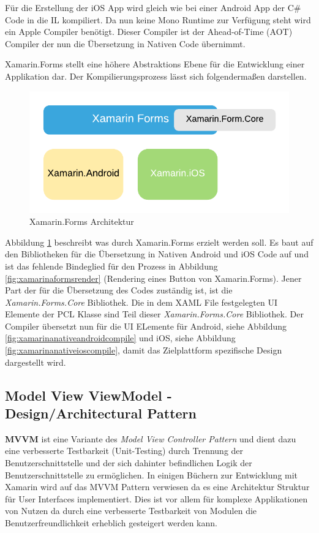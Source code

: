 	Für die Erstellung der iOS App wird gleich wie bei einer Android App der C\# Code in die IL kompiliert. Da nun keine Mono Runtime zur Verfügung steht wird ein Apple Compiler benötigt. Dieser Compiler ist der Ahead-of-Time (AOT) Compiler der nun die Übersetzung in Nativen Code übernimmt.

	Xamarin.Forms stellt eine höhere Abstraktions Ebene für die Entwicklung einer Applikation dar. Der Kompilierungsprozess lässt sich folgendermaßen darstellen.
	\begin{figure}[h!]
		\centering
		\includegraphics[width=1\textwidth]{images/Xamarin-Forms.png}
		\caption{Xamarin.Forms Architektur}
		\label{fig:xamarinformsarchitecture}
	\end{figure}

	Abbildung \ref{fig:xamarinformsarchitecture} beschreibt was durch Xamarin.Forms erzielt werden soll. Es baut auf den Bibliotheken für die Übersetzung in Nativen Android und iOS Code auf und ist das fehlende Bindeglied für den Prozess in Abbildung \ref{fig:xamarinaformsrender} (Rendering eines Button von Xamarin.Forms). Jener Part der für die Übersetzung des Codes zuständig ist, ist die \textit{Xamarin.Forms.Core} Bibliothek. Die in dem XAML File festgelegten UI Elemente der PCL Klasse sind Teil dieser \textit{Xamarin.Forms.Core} Bibliothek. Der Compiler übersetzt nun für die UI ELemente für Android, siehe Abbildung \ref{fig:xamarinanativeandroidcompile} und iOS, siehe Abbildung \ref{fig:xamarinanativeioscompile}, damit das Zielplattform spezifische Design dargestellt wird.
	\newpage

\subsection{Model View ViewModel - Design/Architectural Pattern}
\label{sec:xamarinformsmvvm}
	
	\textbf{MVVM} ist eine Variante des \textit{Model View Controller Pattern} und dient dazu eine verbesserte Testbarkeit (Unit-Testing) durch Trennung der Benutzerschnittstelle und der sich dahinter befindlichen Logik der Benutzerschnittstelle zu ermöglichen. In einigen Büchern zur Entwicklung mit Xamarin wird auf das MVVM Pattern verwiesen da es eine Architektur Struktur für User Interfaces implementiert\cite{book:Xamarin.Forms-Essentials:}. Dies ist vor allem für komplexe Applikationen von Nutzen da durch eine verbesserte Testbarkeit von Modulen die Benutzerfreundlichkeit erheblich gesteigert werden kann.

